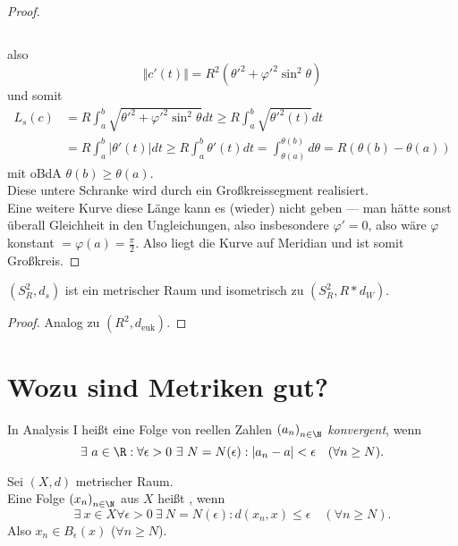 \begin{lemma}
\begin{proof}
\begin{small}
\begin{equation*}
      \end{equation*}
    \end{small}
    also
    \begin{equation*}
      \Vert c'(t) \Vert = R^2({\theta'}^2 + {\varphi'}^2\sin^2\theta)
    \end{equation*}
    und somit
    \begin{align*}
      L_s(c) &= R\int_a^b\sqrt{{\theta'}^2+{\varphi'}^2\sin^2\theta}dt \geq R\int_a^b\sqrt{{\theta'}^2(t)}dt \\
      &= R\int_a^b \vert \theta'(t) \vert dt \geq R\int_a^b \theta'(t)dt = \int_{\theta(a)}^{\theta(b)}d\theta = R(\theta(b)-\theta(a))
    \end{align*}
    mit oBdA \( \theta(b) \geq \theta(a) \). \\
    Diese untere Schranke wird durch ein Großkreissegment realisiert. \\
    Eine weitere Kurve diese Länge kann es (wieder) nicht geben --- man hätte sonst überall Gleichheit in den Ungleichungen, also insbesondere \( \varphi' = 0 \), also wäre \( \varphi \) konstant \( = \varphi(a) = \frac{\pi}{2} \). Also liegt die Kurve auf Meridian und ist somit Großkreis.
  \end{proof}
\end{lemma}

\begin{theorem}
  \( (S^2_R, d_s) \) ist ein metrischer Raum und isometrisch zu \( (S^2_R, R*d_W) \).
  \begin{proof}
    Analog zu \( (R^2, d_\text{euk}) \).
  \end{proof}
\end{theorem}

\section{Wozu sind Metriken gut?}

\begin{remark}
  In Analysis I heißt eine Folge von reellen Zahlen \( {(a_n)}_{n \in \N} \) \emph{konvergent}, wenn
  \begin{equation*}
    \exists \ a \in \R : \forall \epsilon > 0 \ \exists \ N = N(\epsilon) : \vert a_n - a \vert < \epsilon \quad (\forall n \geq N)\text{.}
  \end{equation*}
\end{remark}

\begin{remark}
  Sei \( (X, d) \) metrischer Raum. \\
  Eine Folge \( {(x_n)}_{n \in \N} \) aus \( X \) heißt , wenn
  \begin{equation*}
    \exists \ x \in X \forall \epsilon > 0 \ \exists \ N = N(\epsilon) : d(x_n, x) \leq \epsilon \quad (\forall n \geq N)\text{.}
  \end{equation*}
  Also \( x_n \in B_\epsilon(x) \) (\( \forall n \geq N \)).
\end{remark}

